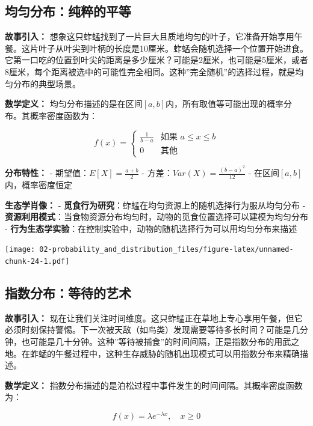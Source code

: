 \documentclass[
  twoside]{book}
\begin{document}
\hypertarget{ux5747ux5300ux5206ux5e03ux7eafux7cb9ux7684ux5e73ux7b49}{%
\subsection{均匀分布：纯粹的平等}\label{ux5747ux5300ux5206ux5e03ux7eafux7cb9ux7684ux5e73ux7b49}}

\textbf{故事引入：} 想象这只蚱蜢找到了一片巨大且质地均匀的叶子，它准备开始享用午餐。这片叶子从叶尖到叶柄的长度是10厘米。蚱蜢会随机选择一个位置开始进食。它第一口吃的位置到叶尖的距离是多少厘米？可能是2厘米，也可能是5厘米，或者8厘米，每个距离被选中的可能性完全相同。这种''完全随机''的选择过程，就是均匀分布的典型场景。

\textbf{数学定义：} 均匀分布描述的是在区间\([a, b]\)内，所有取值等可能出现的概率分布。其概率密度函数为：

\[f(x) = \begin{cases}
\frac{1}{b-a} & \text{如果 } a \leq x \leq b \\
0 & \text{其他}
\end{cases}\]

\textbf{分布特性：}
- 期望值：\(E[X] = \frac{a+b}{2}\)
- 方差：\(Var(X) = \frac{(b-a)^2}{12}\)
- 在区间\([a, b]\)内，概率密度恒定

\textbf{生态学肖像：}
- \textbf{觅食行为研究}：蚱蜢在均匀资源上的随机选择行为服从均匀分布
- \textbf{资源利用模式}：当食物资源分布均匀时，动物的觅食位置选择可以建模为均匀分布
- \textbf{行为生态学实验}：在控制实验中，动物的随机选择行为可以用均匀分布来描述

\texttt{[image: 02-probability\_and\_distribution\_files/figure-latex/unnamed-chunk-24-1.pdf]}

\hypertarget{ux6307ux6570ux5206ux5e03ux7b49ux5f85ux7684ux827aux672f}{%
\subsection{指数分布：等待的艺术}\label{ux6307ux6570ux5206ux5e03ux7b49ux5f85ux7684ux827aux672f}}

\textbf{故事引入：} 现在让我们关注时间维度。这只蚱蜢正在草地上专心享用午餐，但它必须时刻保持警惕。下一次被天敌（如鸟类）发现需要等待多长时间？可能是几分钟，也可能是几十分钟。这种''等待被捕食''的时间间隔，正是指数分布的用武之地。在蚱蜢的午餐过程中，这种生存威胁的随机出现模式可以用指数分布来精确描述。

\textbf{数学定义：} 指数分布描述的是泊松过程中事件发生的时间间隔。其概率密度函数为：

\[f(x) = \lambda e^{-\lambda x}, \quad x \geq 0\]
\end{document}
